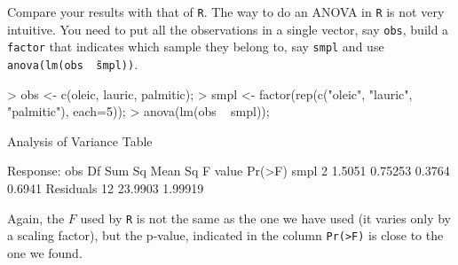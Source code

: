\documentclass[a4paper]{article}
\theoremstyle{definition}
\begin{document}
\begin{Exercise}
Compare your results with that of \texttt{R}. The way to do an ANOVA
in \texttt{R} is not very intuitive. You need to put all the observations
in a single vector, say \texttt{obs}, build a \texttt{factor} that
indicates which sample they belong to, say \texttt{smpl} and use
\texttt{anova(lm(obs \~\ smpl))}.
\end{Exercise}
\begin{Answer}
\begin{Schunk}
\begin{Sinput}
> obs <- c(oleic, lauric, palmitic);
> smpl <- factor(rep(c("oleic", "lauric", "palmitic"), each=5));
> anova(lm(obs ~ smpl));
\end{Sinput}
\begin{Soutput}
Analysis of Variance Table

Response: obs
          Df  Sum Sq Mean Sq F value Pr(>F)
smpl       2  1.5051 0.75253  0.3764 0.6941
Residuals 12 23.9903 1.99919               
\end{Soutput}
\end{Schunk}
\par
Again, the $F$ used by \texttt{R} is not the same as the one we have used
(it varies only by a scaling factor), but the p-value, indicated in the
column \texttt{Pr(>F)} is close to the one we found.
\end{Answer}


\cleardoublepage
\shipoutAnswer
\end{document}

